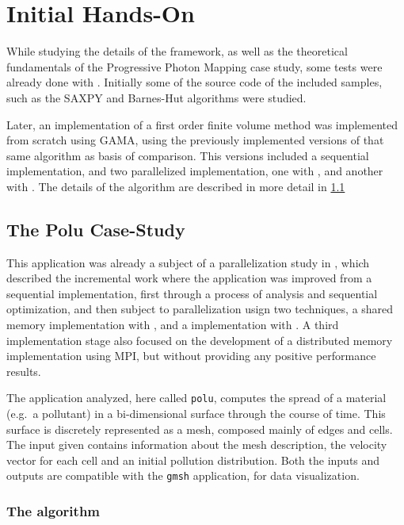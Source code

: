 \documentclass[main.tex]{subfiles}
\begin{document}
\section{Initial Hands-On}

While studying the details of the framework, as well as the theoretical fundamentals of the Progressive Photon Mapping case study, some tests were already done with \gama. Initially some of the source code of the included samples, such as the SAXPY and Barnes-Hut algorithms were studied.

Later, an implementation of a first order finite volume method was implemented from scratch using GAMA, using the previously implemented versions of that same algorithm as basis of comparison. This versions included a sequential implementation, and two parallelized implementation, one with \openmp, and another with \cuda. The details of the algorithm are described in more detail in \cref{sec:polu}

\subsection{The Polu Case-Study} \label{sec:polu}

This application was already a subject of a parallelization study in \cite{naps2012}, which described the incremental work where the application was improved from a sequential implementation, first through a process of analysis and sequential optimization, and then subject to parallelization usign two techniques, a shared memory \cpu implementation with \openmp, and a \gpu implementation with \cuda. A third implementation stage also focused on the development of a distributed memory implementation using \acs{MPI}, but without providing any positive performance results.

The application analyzed, here called \texttt{polu}, computes the spread of a material (e.g.\ a pollutant) in a bi-dimensional surface through the course of time. This surface is discretely represented as a mesh, composed mainly of edges and cells. The input given contains information about the mesh description, the velocity vector for each cell and an initial pollution distribution.
Both the inputs and outputs are compatible with the \texttt{gmsh} application, for data visualization.

\subsubsection{The algorithm}
\end{document}
